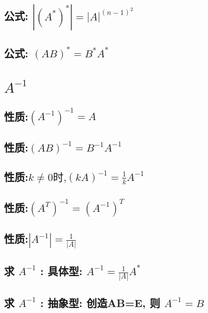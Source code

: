 \documentclass[UTF8]{ctexart}
\begin{document}
		\subsection{公式: $\left| \left( A^* \right) ^* \right|=\left| A \right|^{\left( n-1 \right) ^2}			$} 
		

		\subsection{公式: $\left( AB \right) ^*=B^*A^*$} 
		

	
	
	
	
	\section{$A^{-1}$}
		\subsection{性质:$\left( A^{-1} \right) ^{-1}=A$}
		
		\subsection{性质:$\left( AB \right) ^{-1}=B^{-1}A^{-1}$}
		
		\subsection{性质:$k\ne 0\text{时,}\left( kA \right) ^{-1}=\frac{1}{k}A^{-1}$}
		
		\subsection{性质:$\left( A^T \right) ^{-1}=\left( A^{-1} \right) ^T$}
		
		\subsection{性质:$\left| A^{-1} \right|=\frac{1}{\left| A \right|}$}
		
		\subsection{求 $A^{-1}$ : 具体型: $A^{-1}=\frac{1}{\left| A \right|}A^*$}
		
		\subsection{求 $A^{-1}$ : 抽象型: 创造AB=E, 则 $A^{-1}=B$ }
		
\end{document}
